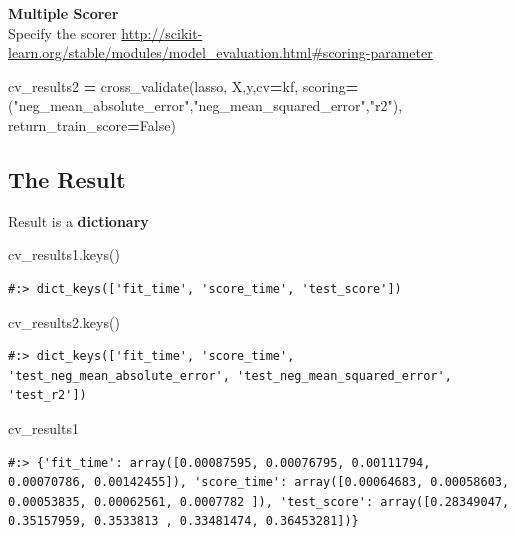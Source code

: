 \documentclass[
]{book}
\newenvironment{Shaded}{\begin{snugshade}}{\end{snugshade}}
\newcommand{\NormalTok}[1]{#1}
\newcommand{\OperatorTok}[1]{\textcolor[rgb]{0.43,0.43,0.43}{\textbf{#1}}}
\newcommand{\StringTok}[1]{\textcolor[rgb]{0.5,0.5,0.5}{#1}}
\newcommand{\VariableTok}[1]{\textcolor[rgb]{0,0,0}{#1}}
\begin{document}
\textbf{Multiple Scorer}\\
Specify the scorer \url{http://scikit-learn.org/stable/modules/model_evaluation.html\#scoring-parameter}

\begin{Shaded}
\begin{Highlighting}[]
\NormalTok{cv_results2 }\OperatorTok{=}\NormalTok{ cross_validate(lasso, X,y,cv}\OperatorTok{=}\NormalTok{kf,}
\NormalTok{    scoring}\OperatorTok{=}\NormalTok{(}\StringTok{"neg_mean_absolute_error"}\NormalTok{,}\StringTok{"neg_mean_squared_error"}\NormalTok{,}\StringTok{"r2"}\NormalTok{),}
\NormalTok{    return_train_score}\OperatorTok{=}\VariableTok{False}\NormalTok{)}
\end{Highlighting}
\end{Shaded}

\hypertarget{the-result}{%
\subsection{The Result}\label{the-result}}

Result is a \textbf{dictionary}

\begin{Shaded}
\begin{Highlighting}[]
\NormalTok{cv_results1.keys()}
\end{Highlighting}
\end{Shaded}

\begin{verbatim}
#:> dict_keys(['fit_time', 'score_time', 'test_score'])
\end{verbatim}

\begin{Shaded}
\begin{Highlighting}[]
\NormalTok{cv_results2.keys()}
\end{Highlighting}
\end{Shaded}

\begin{verbatim}
#:> dict_keys(['fit_time', 'score_time', 'test_neg_mean_absolute_error', 'test_neg_mean_squared_error', 'test_r2'])
\end{verbatim}

\begin{Shaded}
\begin{Highlighting}[]
\NormalTok{cv_results1}
\end{Highlighting}
\end{Shaded}

\begin{verbatim}
#:> {'fit_time': array([0.00087595, 0.00076795, 0.00111794, 0.00070786, 0.00142455]), 'score_time': array([0.00064683, 0.00058603, 0.00053835, 0.00062561, 0.0007782 ]), 'test_score': array([0.28349047, 0.35157959, 0.3533813 , 0.33481474, 0.36453281])}
\end{verbatim}
\end{document}
